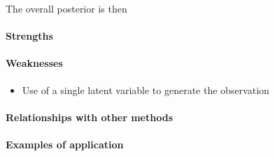 The overall posterior is then
\begin{center}
\end{center}




\paragraph{Strengths}

\paragraph{Weaknesses}
\begin{itemize}
    \item Use of a single latent variable to generate the observation
\end{itemize}

\paragraph{Relationships with other methods}
\paragraph{Examples of application}


